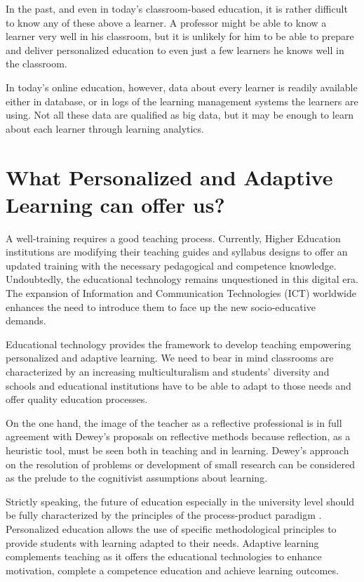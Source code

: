\documentclass[english]{textolivre}
\begin{document}
In the past, and even in today’s classroom-based education, it is rather difficult to know any of these above a learner. A professor might be able to know a learner very well in his classroom, but it is unlikely for him to be able to prepare and deliver personalized education to even just a few learners he knows well in the classroom.

In today’s online education, however, data about every learner is readily available either in database, or in logs of the learning management systems the learners are using. Not all these data are qualified as big data, but it may be enough to learn about each learner through learning analytics.

\section{What Personalized and Adaptive Learning can offer us?}\label{sec-4}
A well-training requires a good teaching process. Currently, Higher Education institutions are modifying their teaching guides and syllabus designs to offer an updated training with the necessary pedagogical and competence knowledge. Undoubtedly, the educational technology remains unquestioned in this digital era. The expansion of Information and Communication Technologies (ICT) worldwide enhances the need to introduce them to face up the new socio-educative demands.

Educational technology provides the framework to develop teaching empowering personalized and adaptive learning. We need to bear in mind classrooms are characterized by an increasing multiculturalism and students’ diversity and schools and educational institutions have to be able to adapt to those needs and offer quality education processes.

On the one hand, the image of the teacher as a reflective professional \cite{schon1991} is in full agreement with Dewey’s proposals on reflective methods because reflection, as a heuristic tool, must be seen both in teaching and in learning. Dewey’s approach on the resolution of problems or development of small research can be considered as the prelude to the cognitivist assumptions about learning.

Strictly speaking, the future of education especially in the university level should be fully characterized by the principles of the process-product paradigm \cite{perez1983}. Personalized education allows the use of specific methodological principles to provide students with learning adapted to their needs. Adaptive learning complements teaching as it offers the educational technologies to enhance motivation, complete a competence education and achieve learning outcomes.
\end{document}
